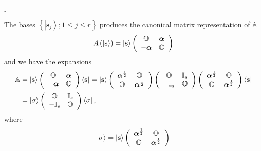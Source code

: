 \documentclass[aps,preprint]{revtex4}%
\begin{document}
$\rfloor$

The bases $\left\{  \left\vert \mathbf{s}_{j}\right\rangle ;1\leq j\leq
r\right\}  $ produces the canonical matrix representation of $\mathbb{A}$
\begin{equation}
A\left(  \left\vert \mathbf{s}\right\rangle \right)  =\left\vert
\mathbf{s}\right\rangle \left(
\begin{array}
[c]{cc}%
\mathbb{O} & \boldsymbol{\alpha}\\
-\boldsymbol{\alpha} & \mathbb{O}%
\end{array}
\right)
\end{equation}
and we have the expansions
\begin{align}
\mathbb{A}  &  =\left\vert \mathbf{s}\right\rangle \left(
\begin{array}
[c]{cc}%
\mathbb{O} & \boldsymbol{\alpha}\\
-\boldsymbol{\alpha} & \mathbb{O}%
\end{array}
\right)  \left\langle \mathbf{s}\right\vert =\left\vert \mathbf{s}%
\right\rangle \left(
\begin{array}
[c]{cc}%
\boldsymbol{\alpha}^{\frac{1}{2}} & \mathbb{O}\\
\mathbb{O} & \boldsymbol{\alpha}^{\frac{1}{2}}%
\end{array}
\right)  \left(
\begin{array}
[c]{cc}%
\mathbb{O} & \mathbb{I}_{s}\\
-\mathbb{I}_{s} & \mathbb{O}%
\end{array}
\right)  \left(
\begin{array}
[c]{cc}%
\boldsymbol{\alpha}^{\frac{1}{2}} & \mathbb{O}\\
\mathbb{O} & \boldsymbol{\alpha}^{\frac{1}{2}}%
\end{array}
\right)  \left\langle \mathbf{s}\right\vert \label{reex}\\
&  =\left\vert \mathbf{\sigma}\right\rangle \left(
\begin{array}
[c]{cc}%
\mathbb{O} & \mathbb{I}_{s}\\
-\mathbb{I}_{s} & \mathbb{O}%
\end{array}
\right)  \left\langle \mathbf{\sigma}\right\vert ,
\end{align}
where
\begin{equation}
\left\vert \mathbf{\sigma}\right\rangle =\left\vert \mathbf{s}\right\rangle
\left(
\begin{array}
[c]{cc}%
\boldsymbol{\alpha}^{\frac{1}{2}} & \mathbb{O}\\
\mathbb{O} & \boldsymbol{\alpha}^{\frac{1}{2}}%
\end{array}
\right)
\end{equation}
\end{document}
